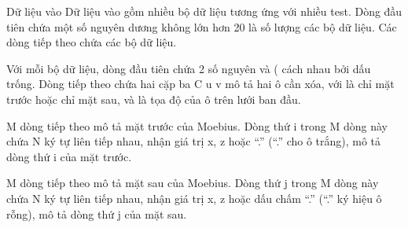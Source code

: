 Dữ liệu vào
Dữ liệu vào gồm nhiều bộ dữ liệu tương ứng với nhiều test. Dòng đầu tiên chứa một số nguyên dương không lớn hơn 20 là số lượng các bộ dữ liệu. Các dòng tiếp theo chứa các bộ dữ liệu.  

   Với mỗi bộ dữ liệu, dòng đầu tiên chứa 2 số nguyên   và   (  cách nhau bởi dấu trống. Dòng tiếp theo chứa hai cặp ba C u v mô tả hai ô cần xóa, với   là   chỉ mặt trước hoặc   chỉ mặt sau,    và    là tọa độ của ô trên lưới ban đầu.  

   M dòng tiếp theo mô tả mặt trước của Moebius. Dòng thứ i trong M dòng này chứa N ký tự liên tiếp nhau, nhận giá trị x, z hoặc “.” (“.” cho ô trắng), mô tả dòng thứ i của mặt trước.  

   M dòng tiếp theo mô tả mặt sau của Moebius. Dòng thứ j trong M dòng này chứa N ký tự liên tiếp nhau, nhận giá trị x, z hoặc dấu chấm “.” (“.” ký hiệu ô rỗng), mô tả dòng thứ j của mặt sau.
